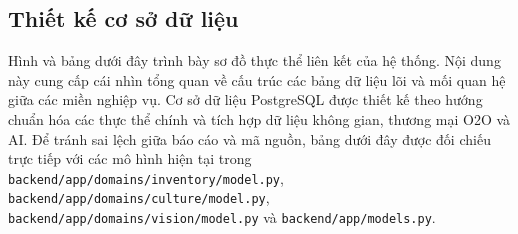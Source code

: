 \documentclass[12pt, a4paper]{article}
\begin{document}
\subsection{Thiết kế cơ sở dữ liệu}
Hình và bảng dưới đây trình bày sơ đồ thực thể liên kết của hệ thống. Nội dung này cung cấp cái nhìn tổng quan về cấu trúc các bảng dữ liệu lõi và mối quan hệ giữa các miền nghiệp vụ. Cơ sở dữ liệu PostgreSQL được thiết kế theo hướng chuẩn hóa các thực thể chính và tích hợp dữ liệu không gian, thương mại O2O và AI. Để tránh sai lệch giữa báo cáo và mã nguồn, bảng dưới đây được đối chiếu trực tiếp với các mô hình hiện tại trong \texttt{backend/app/\allowbreak domains/\allowbreak inventory/\allowbreak model.py}, \texttt{backend/app/\allowbreak domains/\allowbreak culture/\allowbreak model.py}, \texttt{backend/app/\allowbreak domains/\allowbreak vision/\allowbreak model.py} và \texttt{backend/app/\allowbreak models.py}.
\end{document}
